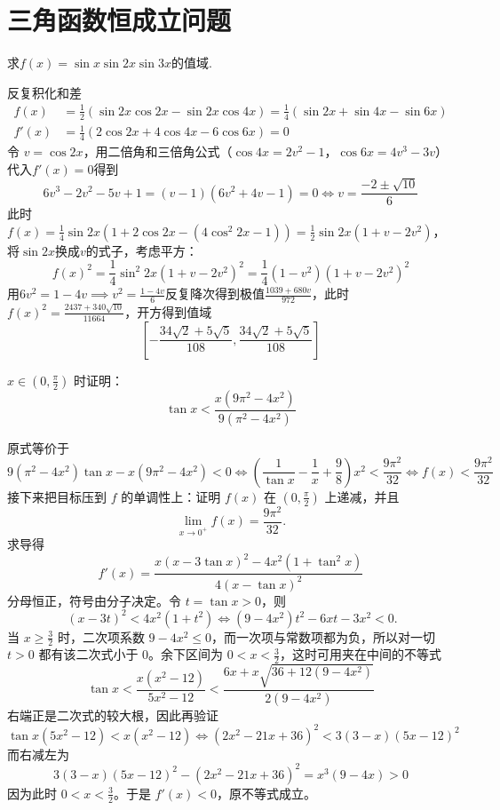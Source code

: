 \section{三角函数恒成立问题}
\begin{example}[经典题]
求$f(x) = \sin x \sin 2x \sin 3x$的值域.
\end{example}
\begin{solution}
反复积化和差
\begin{align*}
    f(x) &= \frac{1}{2}(\sin 2x \cos 2x - \sin 2x \cos 4x)= \frac{1}{4}(\sin 2x + \sin 4x - \sin 6x)\\
    f'(x)&= \frac{1}{4}(2\cos 2x + 4\cos 4x - 6\cos 6x) = 0
\end{align*}
令 $v = \cos 2x$，用二倍角和三倍角公式（$\cos 4x = 2v^2 - 1$，$\cos 6x = 4v^3 - 3v$）代入$f'(x)=0$得到
\[6v^3 - 2v^2 - 5v + 1 = (v - 1)(6v^2 + 4v - 1) = 0\Leftrightarrow v =\frac{-2 \pm \sqrt{10}}{6}\]
此时$f(x) = \frac{1}{4}\sin 2x (1 + 2\cos 2x - (4\cos^2 2x - 1)) = \frac{1}{2}\sin 2x (1 + v - 2v^2)$，将$\sin 2x$换成$v$的式子，考虑平方：$$f(x)^2 = \frac{1}{4}\sin^2 2x (1 + v - 2v^2)^2 = \frac{1}{4}(1 - v^2)(1 + v - 2v^2)^2$$用$6v^2 = 1 - 4v \implies v^2 = \frac{1 - 4v}{6}$反复降次得到极值$ \frac{1039 + 680v}{972}$，此时$f(x)^2 = \frac{2437 + 340\sqrt{10}}{11664}$，开方得到值域\[\left[- \frac{34\sqrt{2} + 5\sqrt{5}}{108}, \frac{34\sqrt{2} + 5\sqrt{5}}{108}\right]\]
\end{solution}

\begin{example}
\( x \in (0, \frac{\pi}{2}) \) 时证明：
\[
\tan x < \frac{x(9\pi^2 - 4x^2)}{9(\pi^2 - 4x^2)}
\]
\end{example}
\begin{solution}
原式等价于
\[
9(\pi^2-4x^2)\tan x - x(9\pi^2-4x^2) < 0
\Leftrightarrow
\left( \frac{1}{\tan x} - \frac{1}{x} + \frac{9}{8} \right)x^2 < \frac{9\pi^2}{32}\Leftrightarrow f(x)< \frac{9\pi^2}{32}
\]
接下来把目标压到 \(f\) 的单调性上：证明 \( f(x) \) 在 \( (0,\frac{\pi}{2}) \) 上递减，并且
\[
\lim_{x\to 0^+} f(x) = \frac{9\pi^2}{32}.
\]
求导得
\[
f'(x) = \frac{x(x-3\tan x)^2 - 4x^2(1+\tan^2 x)}{4(x-\tan x)^2}
\]
分母恒正，符号由分子决定。令 \( t = \tan x > 0 \)，则
\[
\ (x-3t)^2 < 4x^2(1+t^2)
\iff (9-4x^2)t^2 - 6xt - 3x^2 < 0.
\]
当 \( x \ge \frac{3}{2} \) 时，二次项系数 \(9-4x^2\le0\)，而一次项与常数项都为负，所以对一切 \(t>0\) 都有该二次式小于 \(0\)。余下区间为 \(0<x<\frac32\)，这时可用夹在中间的不等式
\[
\tan x < \frac{x(x^2-12)}{5x^2-12} < \frac{6x + x\sqrt{36+12(9-4x^2)}}{2(9-4x^2)}
\]
右端正是二次式的较大根，因此再验证
\[
\tan x(5x^2-12) < x(x^2-12) \iff (2x^2-21x+36)^2 < 3(3-x)(5x-12)^2
\]
而右减左为
\[
3(3-x)(5x-12)^2-(2x^2-21x+36)^2=x^3(9-4x)>0
\]
因为此时 \(0<x<\frac32\)。于是 \(f'(x)<0\)，原不等式成立。
\end{solution}

